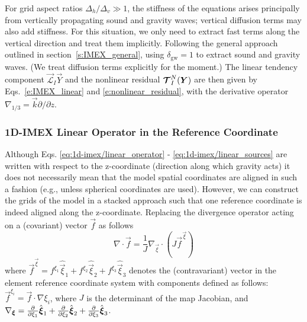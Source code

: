 \documentclass{report}
\begin{document}
For grid aspect ratios $\Delta_h/\Delta_v \gg 1$, the stiffness of the equations arises principally from vertically propagating sound and gravity waves; vertical diffusion terms may also add stiffness. For this situation, we only need to extract fast terms along the vertical direction and treat them implicitly.  Following the general approach outlined in section~\ref{s:IMEX_general}, using $\delta_{\mathrm{gw}}=1$ to extract sound and gravity waves. (We treat diffusion terms explicitly for the moment.) The linear tendency component $\vec{\mathcal{L}}_I \vec{Y}$ and the nonlinear residual $\boldsymbol{{\mathcal{T}}}_I^N(\boldsymbol{{Y}})$ are then given by Eqs.~\eqref{e:IMEX_linear} and \eqref{e:nonlinear_residual}, with the derivative operator $\nabla_{1/3} = \vec{k} \partial/\partial z$.

\subsubsection{1D-IMEX Linear Operator in the Reference Coordinate}
 Although Eqs. \eqref{eq:1d-imex/linear_operator} -  \eqref{eq:1d-imex/linear_sources} are written with respect to the z-coordinate (direction along which gravity acts) it does not necessarily mean that the model spatial coordinates are aligned in such a fashion (e.g., unless spherical coordinates are used). However, we can construct the grids of the model in a stacked approach such that one reference coordinate is indeed aligned along the z-coordinate. 
 Replacing the divergence operator acting on a (covariant) vector $\vec{f}$ as follows
 \[
 \nabla \cdot \vec{f} = \frac{1}{J} \nabla_{\vec{\xi}} \cdot \left(J \vec{f}^{\vec{\xi}} \right)
 \]
 where $\vec{f}^{\vec{\xi}}=f^{\xi_1} \hat{\vec{\xi}}_1 + f^{\xi_2} \hat{\vec{\xi}}_2 + f^{\xi_3} \hat{\vec{\xi}}_3$ denotes the (contravariant) vector in the element reference coordinate system with components defined as follows:
 $\vec{f}^{\xi_i}=\vec{f} \cdot \nabla \xi_i$, where $J$ is the determinant of the map Jacobian, and 
 $\nabla_{\boldsymbol{{\xi}}}=\frac{\partial }{\partial \xi_1} \hat{\boldsymbol{{\xi}}}_1 + \frac{\partial }{\partial \xi_2} \hat{\boldsymbol{{\xi}}}_2 + \frac{\partial }{\partial \xi_3} \hat{\boldsymbol{{\xi}}}_3$. 
 
\end{document}
